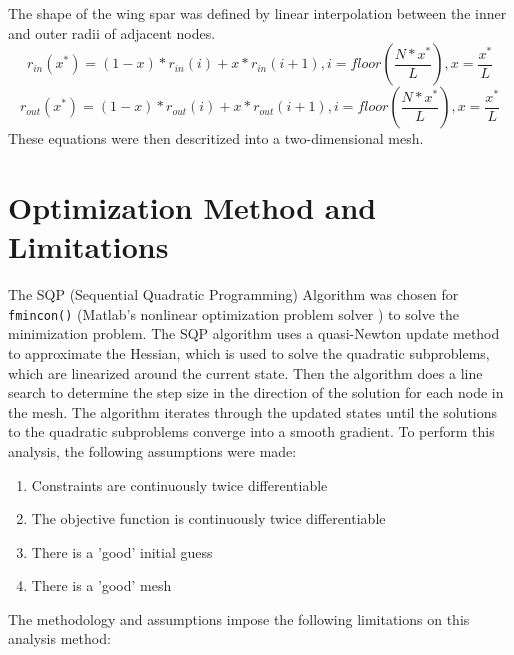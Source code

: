\documentclass[11pt]{article}%
\begin{document}
The shape of the wing spar was defined by linear interpolation between the inner and outer radii of adjacent nodes.
\begin{equation}
r_{in}(x^{*})=(1-x)*r_{in}(i)+x*r_{in}(i+1), i=floor(\frac{N*x^{*}}{L}) ,  x=\frac{x^{*}}{L}
\end{equation}
\begin{equation}
r_{out}(x^{*})=(1-x)*r_{out}(i)+x*r_{out}(i+1), i=floor(\frac{N*x^{*}}{L}) ,  x=\frac{x^{*}}{L}
\end{equation}
These equations were then descritized into a two-dimensional mesh.

\section{Optimization Method and Limitations}
\label{sec:optimizationmethod}
The SQP (Sequential Quadratic Programming) Algorithm was chosen for \lstinline{fmincon()} (Matlab's nonlinear optimization problem solver \cite{matlab}) to solve the minimization problem. The SQP algorithm uses a quasi-Newton update method to approximate the Hessian, which is used to solve the quadratic subproblems, which are linearized around the current state. Then the algorithm does a line search to determine the step size in the direction of the solution for each node in the mesh. The algorithm iterates through the updated states until the solutions to the quadratic subproblems converge into a smooth gradient. To perform this analysis, the following assumptions were made:
\begin{enumerate}
	\item Constraints are continuously twice differentiable
	\item The objective function is continuously twice differentiable
	\item There is a 'good' initial guess
	\item There is a 'good' mesh
\end{enumerate}
The methodology and assumptions impose the following limitations on this analysis method:
\end{document}
